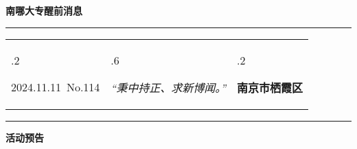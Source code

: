 \documentclass[letterpaper, 12pt]{article}
\begin{document}
\begin{center}
    \Huge\textbf{南哪大专醒前消息}
\end{center}
\vspace{4mm}
\hrule
\renewcommand\tabularxcolumn[1]{m{#1}}
\begin{tabularx}{\textwidth}{>{\hsize.2\hsize}X>{\hsize.6\hsize}X>{\hsize.2\hsize}X}
    \begin{flushleft}
        2024.11.11\, No.114
    \end{flushleft}
    &
    \begin{center}
        \textit{“秉中持正、求新博闻。”}
    \end{center}
    &
    \begin{flushright}
        \textbf{南京市栖霞区}
    \end{flushright}
\end{tabularx}
\vspace{-3.5mm}
\hrule
\vspace{4mm}
\centerline{\huge\textbf{活动预告}}
\end{document}
